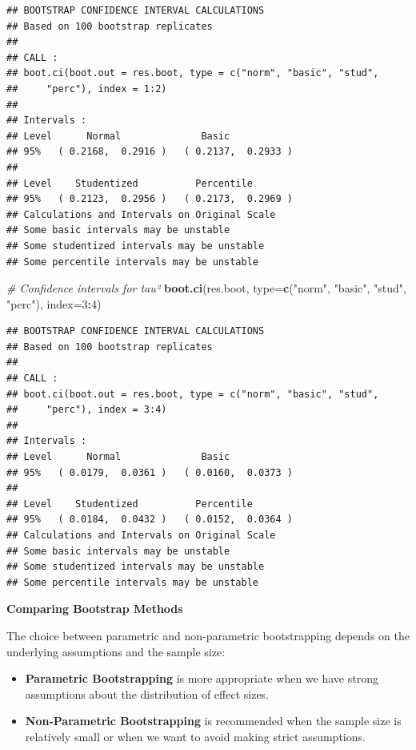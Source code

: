 \documentclass[
]{book}
\newenvironment{Shaded}{\begin{snugshade}}{\end{snugshade}}
\newcommand{\AttributeTok}[1]{\textcolor[rgb]{0.13,0.29,0.53}{#1}}
\newcommand{\CommentTok}[1]{\textcolor[rgb]{0.56,0.35,0.01}{\textit{#1}}}
\newcommand{\DecValTok}[1]{\textcolor[rgb]{0.00,0.00,0.81}{#1}}
\newcommand{\FunctionTok}[1]{\textcolor[rgb]{0.13,0.29,0.53}{\textbf{#1}}}
\newcommand{\NormalTok}[1]{#1}
\newcommand{\SpecialCharTok}[1]{\textcolor[rgb]{0.81,0.36,0.00}{\textbf{#1}}}
\newcommand{\StringTok}[1]{\textcolor[rgb]{0.31,0.60,0.02}{#1}}
\begin{document}
\begin{verbatim}
## BOOTSTRAP CONFIDENCE INTERVAL CALCULATIONS
## Based on 100 bootstrap replicates
## 
## CALL : 
## boot.ci(boot.out = res.boot, type = c("norm", "basic", "stud", 
##     "perc"), index = 1:2)
## 
## Intervals : 
## Level      Normal              Basic         
## 95%   ( 0.2168,  0.2916 )   ( 0.2137,  0.2933 )  
## 
## Level    Studentized          Percentile     
## 95%   ( 0.2123,  0.2956 )   ( 0.2173,  0.2969 )  
## Calculations and Intervals on Original Scale
## Some basic intervals may be unstable
## Some studentized intervals may be unstable
## Some percentile intervals may be unstable
\end{verbatim}

\begin{Shaded}
\begin{Highlighting}[]
\CommentTok{\# Confidence intervals for tau²}
\FunctionTok{boot.ci}\NormalTok{(res.boot, }\AttributeTok{type=}\FunctionTok{c}\NormalTok{(}\StringTok{"norm"}\NormalTok{, }\StringTok{"basic"}\NormalTok{, }\StringTok{"stud"}\NormalTok{, }\StringTok{"perc"}\NormalTok{), }\AttributeTok{index=}\DecValTok{3}\SpecialCharTok{:}\DecValTok{4}\NormalTok{)}
\end{Highlighting}
\end{Shaded}

\begin{verbatim}
## BOOTSTRAP CONFIDENCE INTERVAL CALCULATIONS
## Based on 100 bootstrap replicates
## 
## CALL : 
## boot.ci(boot.out = res.boot, type = c("norm", "basic", "stud", 
##     "perc"), index = 3:4)
## 
## Intervals : 
## Level      Normal              Basic         
## 95%   ( 0.0179,  0.0361 )   ( 0.0160,  0.0373 )  
## 
## Level    Studentized          Percentile     
## 95%   ( 0.0184,  0.0432 )   ( 0.0152,  0.0364 )  
## Calculations and Intervals on Original Scale
## Some basic intervals may be unstable
## Some studentized intervals may be unstable
## Some percentile intervals may be unstable
\end{verbatim}

\textbf{Comparing Bootstrap Methods}

The choice between parametric and non-parametric bootstrapping depends on the underlying assumptions and the sample size:

\begin{itemize}
\item
  \textbf{Parametric Bootstrapping} is more appropriate when we have strong assumptions about the distribution of effect sizes.
\item
  \textbf{Non-Parametric Bootstrapping} is recommended when the sample size is relatively small or when we want to avoid making strict assumptions.
\end{itemize}
\end{document}
